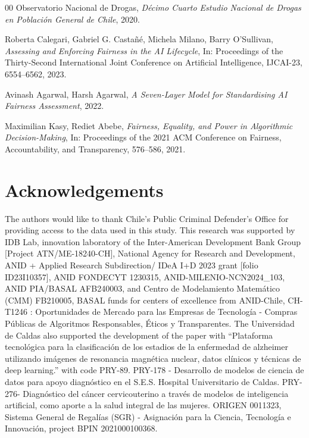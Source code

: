 \documentclass[fleqn,10pt]{wlscirep}
\begin{document}
\begin{thebibliography}{00}
  {Observatorio Nacional de Drogas},
  \textit{D\'ecimo Cuarto Estudio Nacional de Drogas en Poblaci\'on General de Chile},
  2020.


  Roberta Calegari, Gabriel G. Castañé, Michela Milano, Barry O'Sullivan,
  \textit{Assessing and Enforcing Fairness in the AI Lifecycle},
  In: Proceedings of the Thirty-Second International Joint Conference on Artificial Intelligence, {IJCAI-23},
  6554--6562,
  2023.


  Avinash Agarwal, Harsh Agarwal,
  \textit{A Seven-Layer Model for Standardising AI Fairness Assessment},
  2022.


  Maximilian Kasy, Rediet Abebe,
  \textit{Fairness, Equality, and Power in Algorithmic Decision-Making},
  In: Proceedings of the 2021 ACM Conference on Fairness, Accountability, and Transparency,
  576–586,
  2021.
\end{thebibliography}
\clearpage
\section*{Acknowledgements}

The authors would like to thank Chile's Public Criminal Defender’s Office for providing access to the data used in this study. This research was supported by IDB Lab, innovation laboratory of the Inter-American Development Bank Group [Project ATN/ME-18240-CH], National Agency for Research and Development, ANID + Applied Research Subdirection/ IDeA I+D 2023 grant [folio ID23I10357], ANID FONDECYT 1230315, ANID-MILENIO-NCN2024\_103, ANID PIA/BASAL AFB240003, and Centro de Modelamiento Matemático (CMM) FB210005, BASAL funds for centers of excellence from ANID-Chile, CH-T1246 : Oportunidades de Mercado para las Empresas de Tecnología - Compras Públicas de Algoritmos Responsables, Éticos y Transparentes. The Universidad de Caldas also supported the development of the paper with “Plataforma tecnológica para la clasificación de los estadios de la enfermedad de alzheimer utilizando imágenes de resonancia magnética nuclear, datos clínicos y técnicas de deep learning.” with code PRY-89. PRY-178 - Desarrollo de modelos de ciencia de datos para apoyo diagnóstico en el S.E.S. Hospital Universitario de Caldas. PRY-276- Diagnóstico del cáncer cervicouterino a través de modelos de inteligencia artificial, como aporte a la salud integral de las mujeres. ORIGEN 0011323, Sistema General de Regalías (SGR) - Asignación para la Ciencia, Tecnología e Innovación, project BPIN 2021000100368.
\end{document}
